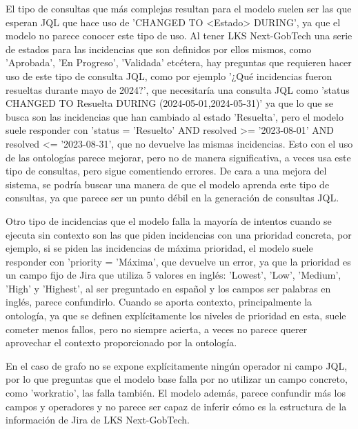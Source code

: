 El tipo de consultas que más complejas resultan para el modelo suelen ser las que esperan JQL que hace uso de 'CHANGED TO <Estado> DURING', ya que el modelo no parece conocer este tipo de uso. Al tener LKS Next-GobTech una serie de estados para las incidencias que son definidos por ellos mismos, como 'Aprobada', 'En Progreso', 'Validada' etcétera, hay preguntas que requieren hacer uso de este tipo de consulta JQL, como por ejemplo '¿Qué incidencias fueron resueltas durante mayo de 2024?', que necesitaría una consulta JQL como 'status CHANGED TO Resuelta DURING (2024-05-01,2024-05-31)' ya que lo que se busca son las incidencias que han cambiado al estado 'Resuelta', pero el modelo suele responder con 'status = 'Resuelto' AND resolved >= '2023-08-01' AND resolved <= '2023-08-31', que no devuelve las mismas incidencias. Esto con el uso de las ontologías parece mejorar, pero no de manera significativa, a veces usa este tipo de consultas, pero sigue comentiendo errores. De cara a una mejora del sistema, se podría buscar una manera de que el modelo aprenda este tipo de consultas, ya que parece ser un punto débil en la generación de consultas JQL.

Otro tipo de incidencias que el modelo falla la mayoría de intentos cuando se ejecuta sin contexto son las que piden incidencias con una prioridad concreta, por ejemplo, si se piden las incidencias de máxima prioridad, el modelo suele responder con 'priority = 'Máxima', que devuelve un error, ya que la prioridad es un campo fijo de Jira que utiliza 5 valores en inglés: 'Lowest', 'Low', 'Medium', 'High' y 'Highest', al ser preguntado en español y los campos ser palabras en inglés, parece confundirlo. Cuando se aporta contexto, principalmente la ontología, ya que se definen explícitamente los niveles de prioridad en esta, suele cometer menos fallos, pero no siempre acierta, a veces no parece querer aprovechar el contexto proporcionado por la ontología.

En el caso de grafo no se expone explícitamente ningún operador ni campo JQL, por lo que preguntas que el modelo base falla por no utilizar un campo concreto, como 'workratio', las falla también. El modelo además, parece confundir más los campos y operadores y no parece ser capaz de inferir cómo es la estructura de la información de Jira de LKS Next-GobTech.